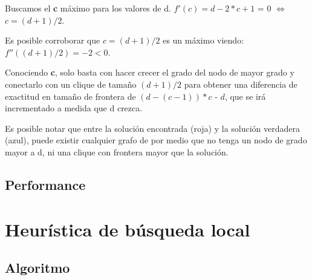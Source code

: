 \documentclass[a4paper, 10pt, twoside]{article}
\begin{document}
Buscamos el \textbf{c} máximo para los valores de d. $f'(c) = d - 2 * c + 1$ = 0 $\Leftrightarrow$ $c = (d + 1)/2$.

Es posible corroborar que $c = (d + 1)/2$ es un máximo viendo: $f''((d + 1)/2) = -2 < 0$.

Conociendo \textbf{c}, solo basta con hacer crecer el grado del nodo de mayor grado y conectarlo con un clique de tamaño $(d + 1)/2$ para obtener una diferencia de exactitud en tamaño de frontera de $(d - (c - 1)) * c$ - $d$, que se irá incrementado a medida que d crezca.

Es posible notar que entre la solución encontrada (roja) y la solución verdadera (azul), puede existir cualquier grafo de por medio que no tenga un nodo de grado mayor a d, ni una clique con frontera mayor que la solución.

\subsection{Performance}


\newpage

\section{Heurística de búsqueda local}
\subsection{Algoritmo}
\end{document}
